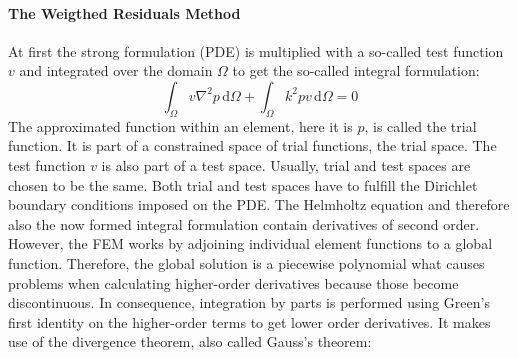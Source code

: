 \documentclass[%
  a4paper,oneside,%
  11pt,%
  smallchapters,
  green,%
  rgb, <cmyk>
  ]{tubsbook}
\begin{document}
\paragraph{The Weigthed Residuals Method}
At first the strong formulation (PDE) is multiplied with a so-called test function $v$ and integrated over the domain $\Omega$ to get the so-called integral formulation:
\begin{equation}
\int_{\Omega} v \nabla^2 p \,\mathrm{d}\Omega + \int_{\Omega} k^2 pv \,\mathrm{d}\Omega = 0
\label{eqn:IntForm}
\end{equation}
%
The approximated function within an element, here it is $p$, is called the trial function. It is part of a constrained space of trial functions, the trial space. The test function $v$ is also part of a test space. Usually, trial and test spaces are chosen to be the same. Both trial and test spaces have to fulfill the Dirichlet boundary conditions imposed on the PDE.
The Helmholtz equation and therefore also the now formed integral formulation contain derivatives of second order. However, the FEM works by adjoining individual element functions to a global function. Therefore, the global solution is a piecewise polynomial \cite{langtangen2019} what causes problems when calculating higher-order derivatives because those become discontinuous. In consequence, integration by parts is performed using Green's first identity \cite[pp. 53,54]{atalla2015} on the higher-order terms to get lower order derivatives. It makes use of the divergence theorem, also called Gauss's theorem:
\end{document}
